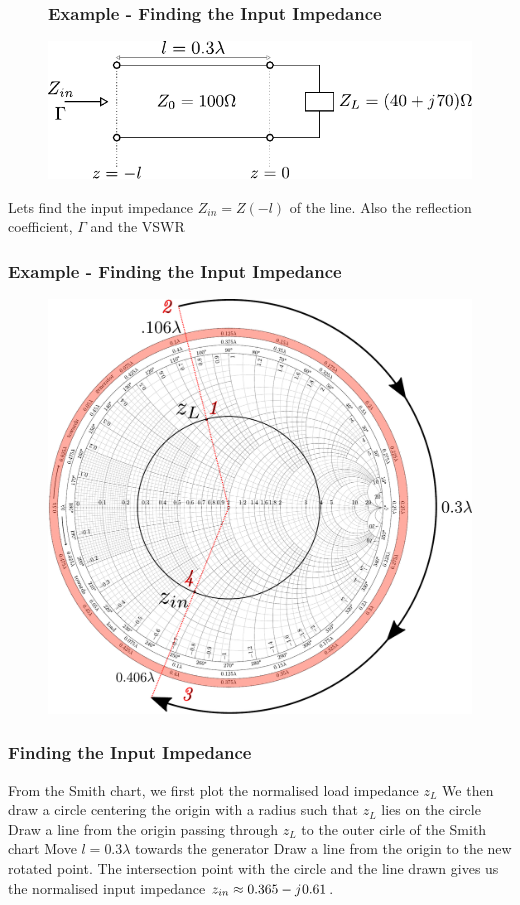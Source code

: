 \documentclass[10pt, compress]{beamer}
\renewcommand{\j}{{j}\mkern1mu} %
\begin{document}
\begin{frame}
    \begin{figure}[t!]
        \frametitle{Example - Finding the Input Impedance}
        \centering
        \includegraphics[width=.9\textwidth]{tline_terminated_example.pdf}
    \end{figure}
    \begin{outline}
        \1 Lets find the input impedance $Z_{in} = Z(-l)$ of the line.
        \1 Also the reflection coefficient, $\Gamma$ and the VSWR
    \end{outline}
\end{frame}

\begin{frame}
    \frametitle{Example - Finding the Input Impedance}
    \begin{figure}[T!]
        \centering
        \includegraphics[width=.70\textwidth]{smith example inkspace.pdf}
    \end{figure}

\end{frame}

\begin{frame}
    \frametitle{Finding the Input Impedance}
    \begin{outline}
        \1 From the Smith chart, we first plot the normalised load impedance $z_L$
        \1 We then draw a circle centering the origin with a radius such that $z_L$ lies on the circle
        \1 Draw a line from the origin passing through $z_L$ to the outer cirle of the Smith chart
        \1 Move $l = 0.3 \lambda$ towards the generator
        \1 Draw a line from the origin to the new rotated point.
        \1 The intersection point with the circle and the line drawn gives us the normalised input impedance $z_{in} \approx 0.365 - \j 0.61 $.
    \end{outline}
\end{frame}
\end{document}
